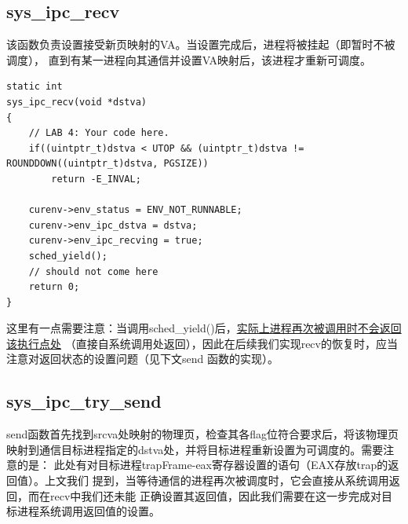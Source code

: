 \documentclass[12pt, letterpaper]{report}
\begin{document}
\subsection{sys\_ipc\_recv}
该函数负责设置接受新页映射的VA。当设置完成后，进程将被挂起（即暂时不被调度），
直到有某一进程向其通信并设置VA映射后，该进程才重新可调度。\par 
\lstset{style=CStyle}
\setmainfont{Consolas}
\begin{lstlisting}
static int
sys_ipc_recv(void *dstva)
{
    // LAB 4: Your code here.	
    if((uintptr_t)dstva < UTOP && (uintptr_t)dstva != ROUNDDOWN((uintptr_t)dstva, PGSIZE))
        return -E_INVAL;
        
    curenv->env_status = ENV_NOT_RUNNABLE;
    curenv->env_ipc_dstva = dstva;
    curenv->env_ipc_recving = true;
    sched_yield();
    // should not come here
    return 0;
}
\end{lstlisting}
\setmainfont{Times New Roman}
这里有一点需要注意：当调用sched\_yield()后，\underline{实际上进程再次被调用时不会返回该执行点处}
（直接自系统调用处返回），因此在后续我们实现recv的恢复时，应当注意对返回状态的设置问题（见下文send
函数的实现）。

\newpage
\subsection{sys\_ipc\_try\_send}
send函数首先找到srcva处映射的物理页，检查其各flag位符合要求后，将该物理页
映射到通信目标进程指定的dstva处，并将目标进程重新设置为可调度的。需要注意的是：
此处有对目标进程trapFrame-eax寄存器设置的语句（EAX存放trap的返回值）。上文我们
提到，当等待通信的进程再次被调度时，它会直接从系统调用返回，而在recv中我们还未能
正确设置其返回值，因此我们需要在这一步完成对目标进程系统调用返回值的设置。\par 
\end{document}
